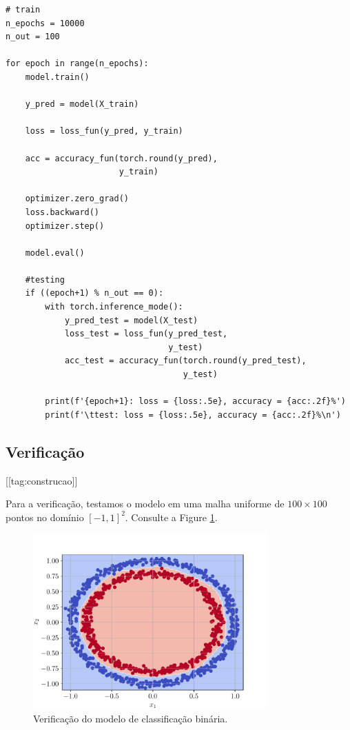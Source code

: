 \begin{lstlisting}[caption=mlp\_classbin.py, label=cap_mlp_sec_classbin:cod:classbin]
# train
n_epochs = 10000
n_out = 100

for epoch in range(n_epochs):
    model.train()

    y_pred = model(X_train)

    loss = loss_fun(y_pred, y_train)

    acc = accuracy_fun(torch.round(y_pred),
                       y_train)

    optimizer.zero_grad()
    loss.backward()
    optimizer.step()

    model.eval()

    #testing
    if ((epoch+1) % n_out == 0):
        with torch.inference_mode():
            y_pred_test = model(X_test)
            loss_test = loss_fun(y_pred_test,
                                 y_test)
            acc_test = accuracy_fun(torch.round(y_pred_test),
                                    y_test)

        print(f'{epoch+1}: loss = {loss:.5e}, accuracy = {acc:.2f}%')
        print(f'\ttest: loss = {loss:.5e}, accuracy = {acc:.2f}%\n')
\end{lstlisting}

\subsection{Verificação}

[[tag:construcao]]

Para a verificação, testamos o modelo em uma malha uniforme de $100\times 100$ pontos no domínio $[-1, 1]^2$. Consulte a Figure \ref{cap_mlp_sec_classbin:fig:result}.

\begin{figure}[H]
  \centering
  \includegraphics[width=0.8\textwidth]{./cap_mlp/dados/fig_classbin_result/fig}
  \caption{Verificação do modelo de classificação binária.}
  \label{cap_mlp_sec_classbin:fig:result}
\end{figure}


